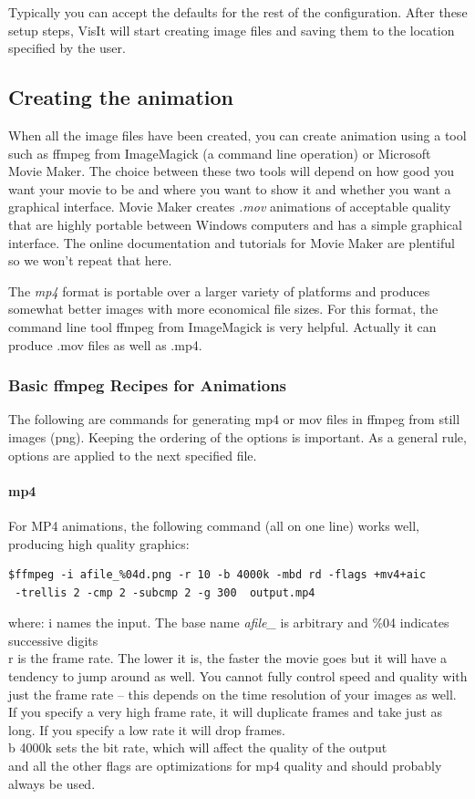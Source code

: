 \documentclass[12pt]{report}
\begin{document}
Typically you can accept the defaults for the rest of the configuration. 
After these setup steps, VisIt will start creating image files 
and saving them to the location specified by the user.
				
\subsection{Creating the animation}
When all the image files have been created, you can create animation using 
a tool such as ffmpeg from ImageMagick (a command line operation) or 
Microsoft Movie Maker. The choice between these two tools will depend on how
good you want your movie to be and where you want to show it and whether you 
want a graphical interface. Movie Maker creates {\em *.mov} animations 
of acceptable quality that are highly portable between
Windows computers and has a simple graphical interface. The online documentation 
and tutorials for Movie Maker are plentiful so we won't repeat that here.

The {\em mp4} format is portable over a larger variety of platforms and produces
somewhat better images with more economical file sizes. For this format, the 
command line tool ffmpeg from ImageMagick is very helpful. Actually it can produce
.mov files as well as .mp4.

\subsubsection{Basic ffmpeg Recipes for Animations}
The following are commands for generating mp4 or mov files in ffmpeg from still images (png). Keeping the ordering of the options is important. As a general rule, options are applied to the next specified file. 


\paragraph{mp4}
For MP4 animations, the following command (all on one line) works well, producing high quality graphics:
\begin{verbatim}
$ffmpeg -i afile_%04d.png -r 10 -b 4000k -mbd rd -flags +mv4+aic
 -trellis 2 -cmp 2 -subcmp 2 -g 300  output.mp4 
\end{verbatim}
where:
\-i names the input. The base name {\em afile\_} is arbitrary and \%04 indicates successive digits \\ 
\-r is the frame rate. The lower it is, the faster the movie goes but it will have a tendency to jump around as well. You cannot fully control speed and quality with just the frame rate – this depends on the time resolution of your images as well. If you specify a very high frame rate, it will duplicate frames and take just as long. If you specify a low rate it will drop frames. \\
\-b 4000k sets the bit rate, which will affect the quality of the output \\
and all the other flags are optimizations for mp4 quality and should probably always be used. 
\end{document}
